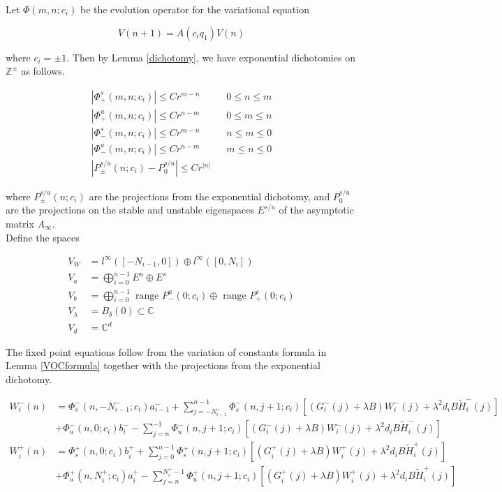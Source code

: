 \documentclass[12pt]{article}
\def\C{{\mathbb C}}
\def\Z{{\mathbb Z}}
\begin{document}
Let $\Phi(m, n; c_i)$ be the evolution operator for the variational equation

\[
V(n+1) = A(c_i q_1) V(n) 
\]

where $c_i = \pm 1$. Then by Lemma \ref{dichotomy}, we have exponential dichotomies on $\Z^\pm$ as follows.

\begin{align*}
|\Phi_+^s(m, n; c_i)| \leq C r^{m - n} && 0 \leq n \leq m \\
|\Phi_+^u(m, n; c_i)| \leq C r^{n - m} && 0 \leq m \leq n \\
|\Phi_-^s(m, n; c_i)| \leq C r^{m - n} && n \leq m \leq 0 \\
|\Phi_-^u(m, n; c_i)| \leq C r^{n - m} && m \leq n \leq 0 \\
|P_\pm^{s/u}(n; c_i) - P_0^{s/u}| \leq C r^{|n|}
\end{align*}

where $P_\pm^{s/u}(n; c_i)$ are the projections from the exponential dichotomy, and $P_0^{s/u}$ are the projections on the stable and unstable eigenspaces $E^{s/u}$ of the asymptotic matrix $A_\infty$.\\

Define the spaces

\begin{align*}
V_W &= l^\infty([-N_{i-1}, 0]) \oplus l^\infty([0, N_i])  \\
V_a &= \bigoplus_{i=0}^{n-1} E^u \oplus E^s \\
V_b &= \bigoplus_{i=0}^{n-1} 
\text{ range } P_-^u(0; c_i) \oplus \text{ range } P_+^s(0; c_i)\\
V_\lambda &= B_\delta(0) \subset \C \\
V_d &= \C^d
\end{align*}

The fixed point equations follow from the variation of constants formula in Lemma \ref{VOCformula} together with the projections from the exponential dichotomy.

\begin{align*}
W_i^-(n) &= 
\Phi_s^-(n, -N_{i-1}^-; c_i) a_{i-1}^- + \sum_{j = -N_{i-1}^-}^{n-1} \Phi_s^-(n, j+1; c_i)
[(G_i^-(j) + \lambda B) W_i^-(j) + \lambda^2 d_i B \tilde{H}_i^-(j)]
 \\
&+ \Phi_u^-(n, 0; c_i) b_i^- - \sum_{j = n}^{-1} \Phi_u^-(n, j+1; c_i) 
[(G_i^-(j) + \lambda B) W_i^-(j) + \lambda^2 d_i B \tilde{H}_i^-(j)] \\
W_i^+(n) &= \Phi_s^+(n, 0; c_i) b_i^+ + \sum_{j = 0}^{n-1} \Phi_s^+(n, j+1; c_i) 
[(G_i^+(j) + \lambda B) W_i^+(j) + \lambda^2 d_i B \tilde{H}_i^+(j)] \\
&+ \Phi_u^+(n, N_i^+; c_i) a_i^+ - \sum_{j = n}^{N_i^+-1} \Phi_u^+(n, j+1; c_i) 
[(G_i^+(j) + \lambda B) W_i^+(j) + \lambda^2 d_i B \tilde{H}_i^+(j)]
\end{align*}
\end{document}
